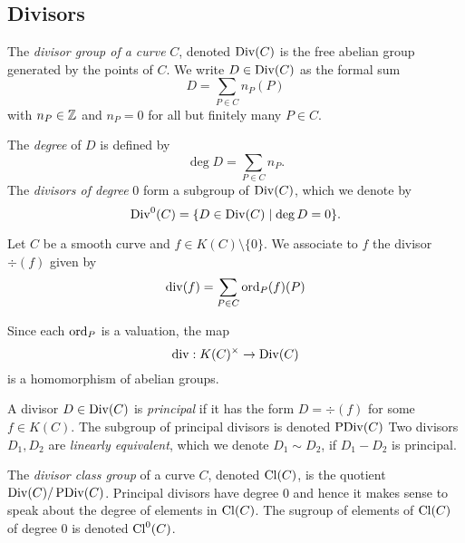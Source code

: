 \subsection{Divisors}

\begin{definition}
	The \emph{divisor group of a curve} $C$, denoted $\operatorname{Div}(C)$ is the free
	abelian group generated by the points of $C$. We write $D \in \operatorname{Div}(C)$ as
	the formal sum
	\begin{equation*}
		D = \sum_{P \in C} n_P(P)
	\end{equation*}
	with $n_P \in \mathbb{Z}$ and $n_P = 0$ for all but finitely many $P \in C$.

	The \emph{degree} of $D$ is defined by
	\begin{equation*}
		\deg D = \sum_{P \in C} n_P.
	\end{equation*}
	The \emph{divisors of degree} 0 form a subgroup of $\operatorname{Div}(C)$, which we denote
	by
	\begin{equation*}
		\operatorname{Div}^0(C) = \{D \in \operatorname{Div}(C) \mid \deg D = 0\}.
	\end{equation*}
\end{definition}

\begin{definition}
	Let $C$ be a smooth curve and $f \in K(C)\setminus\{0\}$. We
	associate to $f$ the divisor $\div(f)$ given by
	\begin{equation*}
		\operatorname{div}(f) = \sum_{P \in C}\operatorname{ord}_P(f)(P)
	\end{equation*}
\end{definition}

\begin{remark}
	Since each $\operatorname{ord}_P$ is a valuation, the map
	\begin{equation*}
		\operatorname{div}: K(C)^\times \to \operatorname{Div}(C)
	\end{equation*}
	is a homomorphism of abelian groups.
\end{remark}

\begin{definition}
	A divisor $D \in \operatorname{Div}(C)$ is \emph{principal} if it has the form
	$D = \div(f)$ for some $f \in K(C)$. The subgroup of principal divisors
	is denoted $\operatorname{PDiv}(C)$
	Two divisors $D_1, D_2$ are \emph{linearly equivalent}, which we denote
	$D_1 \sim D_2$, if $D_1 - D_2$ is principal.
\end{definition}

\begin{definition}
	The \emph{divisor class group} of a curve $C$,
	denoted $\operatorname{Cl}(C)$, is the quotient $\operatorname{Div}(C)/\operatorname{PDiv}(C)$.
	Principal divisors have degree $0$ and hence it makes sense to speak about
	the degree of elements in $\operatorname{Cl}(C)$. The sugroup of elements of $\operatorname{Cl}(C)$ of
	degree $0$ is denoted $\operatorname{Cl}^0(C)$.
\end{definition}

